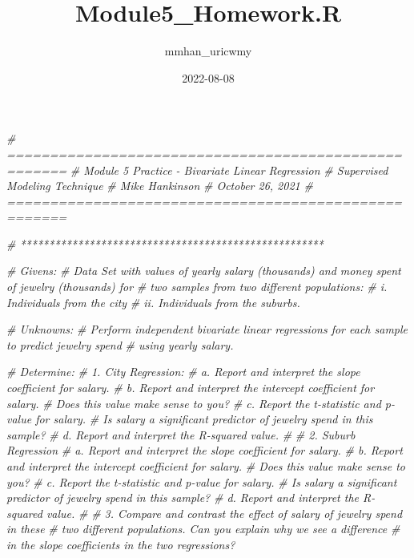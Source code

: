 \documentclass[
]{article}
\title{Module5\_Homework.R}
\author{mmhan\_uricwmy}
\date{2022-08-08}
\newenvironment{Shaded}{\begin{snugshade}}{\end{snugshade}}
\newcommand{\CommentTok}[1]{\textcolor[rgb]{0.56,0.35,0.01}{\textit{#1}}}
\begin{document}
\maketitle

\begin{Shaded}
\begin{Highlighting}[]
\CommentTok{\# =====================================================}
\CommentTok{\# Module 5 Practice {-} Bivariate Linear Regression}
\CommentTok{\#                     Supervised Modeling Technique}
\CommentTok{\# Mike Hankinson}
\CommentTok{\# October 26, 2021}
\CommentTok{\# =====================================================}

\CommentTok{\# *****************************************************}

\CommentTok{\# Givens:   }
    \CommentTok{\# Data Set with values of yearly salary (thousands) and money spent of jewelry (thousands) for }
    \CommentTok{\# two samples from two different populations: }
    \CommentTok{\#   i.  Individuals from the city }
    \CommentTok{\#   ii. Individuals from the suburbs. }

\CommentTok{\# Unknowns: }
    \CommentTok{\# Perform independent bivariate linear regressions for each sample to predict jewelry spend }
    \CommentTok{\# using yearly salary. }

\CommentTok{\# Determine:}
    \CommentTok{\# 1. City Regression:}
    \CommentTok{\#   a. Report and interpret the slope coefficient for salary.}
    \CommentTok{\#   b. Report and interpret the intercept coefficient for salary. }
    \CommentTok{\#      Does this value make sense to you?}
    \CommentTok{\#   c. Report the t{-}statistic and p{-}value for salary. }
    \CommentTok{\#      Is salary a significant predictor of jewelry spend in this sample?}
    \CommentTok{\#   d. Report and interpret the R{-}squared value.}
    \CommentTok{\# }
    \CommentTok{\# 2. Suburb Regression}
    \CommentTok{\#   a. Report and interpret the slope coefficient for salary.}
    \CommentTok{\#   b. Report and interpret the intercept coefficient for salary. }
    \CommentTok{\#      Does this value make sense to you?}
    \CommentTok{\#   c. Report the t{-}statistic and p{-}value for salary. }
    \CommentTok{\#      Is salary a significant predictor of jewelry spend in this sample?}
    \CommentTok{\#   d. Report and interpret the R{-}squared value.}
    \CommentTok{\# }
    \CommentTok{\# 3. Compare and contrast the effect of salary of jewelry spend in these }
    \CommentTok{\#    two different populations. Can you explain why we see a difference }
    \CommentTok{\#    in the slope coefficients in the two regressions?}


\end{Highlighting}
\end{Shaded}
\end{document}
